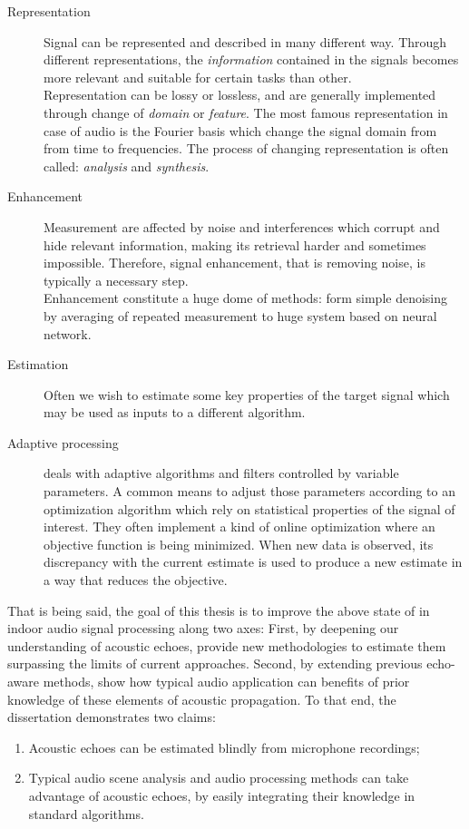 \begin{description}
    \item[Representation] Signal can be represented and described in many different way.
    Through different representations, the \textit{information} contained in the signals becomes more relevant and suitable for certain tasks than other.
    \\Representation can be lossy or lossless, and are generally implemented through change of \textit{domain} or \textit{feature}.
    The most famous representation in case of audio is the Fourier basis which change the signal domain from from time to frequencies.
    The process of changing representation is often called: \textit{analysis} and \textit{synthesis}.

    \item[Enhancement] Measurement are affected by noise and interferences which corrupt and hide relevant information, making its retrieval harder and sometimes impossible.
    Therefore, signal enhancement, that is removing noise, is typically a necessary step.
    \\Enhancement constitute a huge dome of methods:
    form simple denoising by averaging of repeated measurement to huge system based on neural network.

    \item[Estimation] Often we wish to estimate some key properties of the target signal which may be used as inputs to a different algorithm.

    \item[Adaptive processing] deals with adaptive algorithms and filters controlled by variable parameters.
    A common means to adjust those parameters according to an optimization algorithm which rely on statistical properties of the signal of interest.
    They often implement a kind of online optimization where an objective function is being minimized.
    When new data is observed, its discrepancy with the current estimate is used to produce a new estimate in a way that reduces the objective.
\end{description}


That is being said, the goal of this thesis is to improve the above state of in indoor audio signal processing along two axes:
First, by deepening our understanding of acoustic echoes, provide new methodologies to estimate them surpassing the limits of current approaches.
Second, by extending previous echo-aware methods, show how typical audio application can benefits of prior knowledge of these elements of acoustic propagation.
\mynewline
To that end, the dissertation demonstrates two claims:
\begin{enumerate}
    \item Acoustic echoes can be estimated blindly from microphone recordings;
    \item Typical audio scene analysis and audio processing methods can take advantage of acoustic echoes, by easily integrating their knowledge in standard algorithms.
\end{enumerate}


